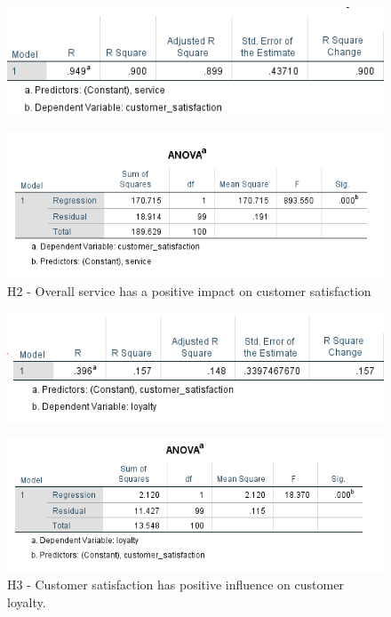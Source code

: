 \documentclass[a4paper, 14pt]{article}
\begin{document}
{\begin{figure}[H]
\centering
\includegraphics[scale=1]{sp_vs_cs.png}
\end{figure}

\begin{figure}[H]
\centering
\includegraphics[scale=1]{anova_css.png}
\caption{H2 - Overall service has a positive impact on customer satisfaction}
\end{figure}

\begin{figure}[H]
\centering
\includegraphics[scale=1]{customer_satisfaction_vs_loyalty.png}
\end{figure}

\begin{figure}[H]
\centering
\includegraphics[scale=1]{anova_cs_lo.png}
\caption{H3 - Customer satisfaction has positive influence on customer loyalty.}
\end{figure}

}
\end{document}

